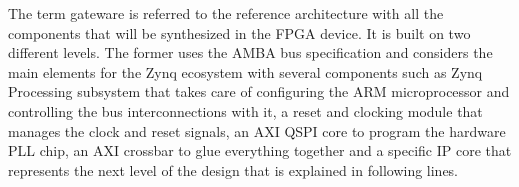 %
%

The term gateware is referred to the reference architecture with all the components that will be synthesized in the FPGA device. It is built on two different levels. The former uses the AMBA bus specification and considers the main elements for the Zynq ecosystem with several components such as Zynq Processing subsystem that takes care of configuring the ARM microprocessor and controlling the bus interconnections with it, a reset and clocking module that manages the clock and reset signals, an AXI QSPI core to program the hardware PLL chip, an AXI crossbar to glue everything together and a specific IP core that represents the next level of the design that is explained in following lines.



